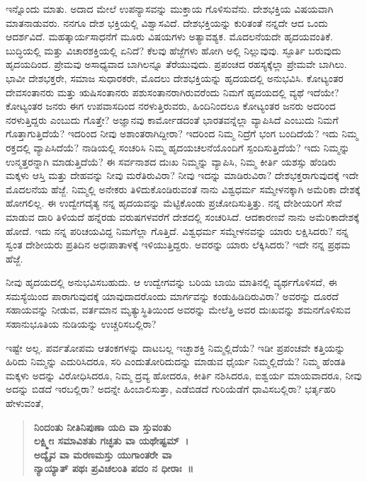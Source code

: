 \vskip   4pt

ಇನ್ನೊಂದು ಮಾತು. ಅದಾದ ಮೇಲೆ ಉಪನ್ಯಾಸವನ್ನು ಮುಕ್ತಾಯ ಗೊಳಿಸುವೆನು. ದೇಶಭಕ್ತಿಯ ವಿಷಯವಾಗಿ ಮಾತನಾಡುವರು. ನನಗೂ ದೇಶ ಭಕ್ತಿಯಲ್ಲಿ ವಿಶ್ವಾಸವಿದೆ. ದೇಶಭಕ್ತಿಯನ್ನು ಕುರಿತಂತೆ ನನ್ನದೇ ಆದ ಒಂದು ಆದರ್ಶವಿದೆ. ಮಹತ್ಕಾರ್ಯಸಾಧನೆಗೆ ಮೂರು ವಿಷಯಗಳು ಅತ್ಯಾವಶ್ಯಕ. ಮೊದಲನೆಯದೇ ಹೃದಯವಂತಿಕೆ. ಬುದ್ಧಿಯಲ್ಲಿ ಮತ್ತು ವಿಚಾರಶಕ್ತಿಯಲ್ಲಿ ಏನಿದೆ? ಕೆಲವು ಹೆಜ್ಜೆಗಳು ಹೋಗಿ ಅಲ್ಲಿ ನಿಲ್ಲುವುವು. ಸ್ಫೂರ್ತಿ ಬರುವುದು ಹೃದಯದಿಂದ. ಪ್ರೇಮವು ಅಸಾಧ್ಯವಾದ ಬಾಗಿಲನ್ನೂ ತೆರೆಯುವುದು. ಪ್ರಪಂಚದ ರಹಸ್ಯಕ್ಕೆಲ್ಲಾ ಪ್ರೇಮವೇ ಬಾಗಿಲು. ಭಾವೀ ದೇಶಭಕ್ತರೇ, ಸಮಾಜ ಸುಧಾರಕರೇ, ಮೊದಲು ದೇಶಭಕ್ತಿಯನ್ನು ಹೃದಯದಲ್ಲಿ ಅನುಭವಿಸಿ. ಕೋಟ್ಯಂತರ ದೇವಸಂತಾನರು ಮತ್ತು ಋಷಿಸಂತಾನರು ಪಶುಸಂತಾನರಾಗಿರುವರೆಂದು ನಿಮಗೆ ಹೃದಯದಲ್ಲಿ ವ್ಯಥೆ ಇದೆಯೇ? ಕೋಟ್ಯಂತರ ಜನರು ಈಗ ಉಪವಾಸದಿಂದ ನರಳುತ್ತಿರುವರು, ಹಿಂದಿನಿಂದಲೂ ಕೋಟ್ಯಂತರ ಜನರು ಅದರಿಂದ ನರಳುತ್ತಿದ್ದರು ಎಂಬುದು ಗೊತ್ತೇ? ಅಜ್ಞಾನವು ಕಾರ್ಮೋಡದಂತೆ ಭಾರತವನ್ನೆಲ್ಲಾ ವ್ಯಾಪಿಸಿದೆ ಎಂಬುದು ನಿಮಗೆ ಗೊತ್ತಾಗುತ್ತಿದೆಯೆ? ಇದರಿಂದ ನೀವು ಅಶಾಂತರಾಗಿದ್ದೀರಾ? ಇದರಿಂದ ನಿಮ್ಮ ನಿದ್ರೆಗೆ ಭಂಗ ಬಂದಿದೆಯೆ? ಇದು ನಿಮ್ಮ ರಕ್ತದಲ್ಲಿ ವ್ಯಾಪಿಸಿದೆಯೆ? ನಾಡಿಯಲ್ಲಿ ಸಂಚರಿಸಿ ನಿಮ್ಮ ಹೃದಯಚಲನೆಯೊಂದಿಗೆ ಸ್ಪಂದಿಸುತ್ತಿದೆಯೆ? ಇದು ನಿಮ್ಮನ್ನು ಉನ್ಮತ್ತರನ್ನಾಗಿ ಮಾಡುತ್ತಿದೆಯೆ? ಈ ಸರ್ವನಾಶದ ದುಃಖ ನಿಮ್ಮನ್ನು ವ್ಯಾಪಿಸಿ, ನಿಮ್ಮ ಕೀರ್ತಿ ಯಶಸ್ಸು ಹೆಂಡಿರು ಮಕ್ಕಳು ಆಸ್ತಿ ಮತ್ತು ದೇಹವನ್ನು ನೀವು ಮರೆತಿರುವಿರಾ? ನೀವು ಇದನ್ನು ಮಾಡಿರುವಿರಾ? ದೇಶಭಕ್ತರಾಗುವುದಕ್ಕೆ ಇದೇ ಮೊದಲನೆಯ ಹೆಜ್ಜೆ. ನಿಮ್ಮಲ್ಲಿ ಅನೇಕರು ತಿಳಿದುಕೊಂಡಿರುವಂತೆ ನಾನು ವಿಶ್ವಧರ್ಮ ಸಮ್ಮೇಳನಕ್ಕಾಗಿ ಅಮೆರಿಕಾ ದೇಶಕ್ಕೆ ಹೋಗಲಿಲ್ಲ. ಈ ಉದ್ವೇಗದೈತ್ಯ ನನ್ನ ಹೃದಯವನ್ನು ಮೆಟ್ಟಿಕೊಂಡು ಪ್ರಚೋದಿಸುತ್ತಿತ್ತು. ನನ್ನ ದೇಶೀಯರಿಗೆ ಸೇವೆ ಮಾಡುವ ದಾರಿ ತಿಳಿಯದೆ ಹನ್ನೆರಡು ವರುಷಗಳವರೆಗೆ ದೇಶದಲ್ಲಿ ಸಂಚರಿಸಿದೆ. ಆದಕಾರಣವೆ ನಾನು ಅಮೆರಿಕಾದೇಶಕ್ಕೆ ಹೋದೆ. ಇದು ನನ್ನ ಪರಿಚಯವಿದ್ದ ನಿಮಗೆಲ್ಲಾ ಗೊತ್ತಿದೆ. ವಿಶ್ವಧರ್ಮ ಸಮ್ಮೇಳನವನ್ನು ಯಾರು ಲಕ್ಷಿಸಿದರು? ನನ್ನ ಸ್ವಂತ ದೇಶೀಯರು ಪ್ರತಿದಿನ ಅಧಃಪಾತಾಳಕ್ಕೆ ಇಳಿಯುತ್ತಿದ್ದರು. ಅವರನ್ನು ಯಾರು ಲೆಕ್ಕಿಸಿದರು? ಇದೇ ನನ್ನ ಪ್ರಥಮ ಹೆಜ್ಜೆ.

\vskip   4pt

ನೀವು ಹೃದಯದಲ್ಲಿ ಅನುಭವಿಸಬಹುದು. ಆ ಉದ್ವೇಗವನ್ನು ಬರಿಯ ಬಾಯಿ ಮಾತಿನಲ್ಲಿ ವ್ಯರ್ಥಗೊಳಿಸದೆ, ಈ ಸಮಸ್ಯೆಯಿಂದ ಪಾರಾಗುವುದಕ್ಕೆ ಯಾವುದಾದರೊಂದು ಮಾರ್ಗವನ್ನು ಕಂಡುಹಿಡಿದಿರುವಿರಾ? ಅವರನ್ನು ದೂರದೆ ಸಹಾಯವನ್ನು ನೀಡುವ, ವರ್ತಮಾನ ಮೃತ್ಯುಸ್ಥಿತಿಯಿಂದ ಅವರನ್ನು ಮೇಲೆತ್ತಿ ಅವರ ದುಃಖವನ್ನು ಶಮನಗೊಳಿಸುವ ಸಹಾನುಭೂತಿಯ ನುಡಿಯನ್ನು ಉಚ್ಚರಿಸಬಲ್ಲಿರಾ?

\vskip   4pt

ಇಷ್ಟೇ ಅಲ್ಲ. ಪರ್ವತೋಪಮ ಆತಂಕಗಳನ್ನು ದಾಟಬಲ್ಲ ಇಚ್ಛಾಶಕ್ತಿ ನಿಮ್ಮಲ್ಲಿದೆಯೆ? ಇಡೀ ಪ್ರಪಂಚವೇ ಕತ್ತಿಯನ್ನು ಹಿರಿದು ನಿಮ್ಮನ್ನು ಎದುರಿಸಿದರೂ, ಸರಿ ಎಂದು\break ತೋರಿದುದನ್ನು ಮಾಡುವ ಧೈರ್ಯ ನಿಮ್ಮಲ್ಲಿದೆಯೆ? ನಿಮ್ಮ ಹೆಂಡತಿ ಮಕ್ಕಳು ಅದನ್ನು ವಿರೋಧಿಸಿದರೂ, ನಿಮ್ಮ ದ್ರವ್ಯ ಹೋದರೂ, ಕೀರ್ತಿ ನಶಿಸಿದರೂ, ಐಶ್ವರ್ಯ ಮಾಯವಾದರೂ, ನೀವು ಅದನ್ನು ಬಿಡದೆ ಇರಬಲ್ಲಿರಾ? ಅದನ್ನೇ ಹಿಂಬಾಲಿಸುತ್ತಾ, ಎಡೆಬಿಡದೆ ಗುರಿಯೆಡೆಗೆ ಧಾವಿಸಬಲ್ಲಿರಾ? ಭರ್ತೃಹರಿ ಹೇಳುವಂತೆ,

\begin{verse}
\textbf{ನಿಂದಂತು ನೀತಿನಿಪುಣಾ ಯದಿ ವಾ ಸ್ತುವಂತು}\\\textbf{ಲಕ್ಷ್ಮೀಃ ಸಮಾವಿಶತು ಗಚ್ಛತು ವಾ ಯಥೇಷ್ಟಮ್​~।}\\\textbf{ಅದ್ಯೈವ ವಾ ಮರಣಮಸ್ತು ಯುಗಾಂತರೇ ವಾ}\\\textbf{ನ್ಯಾಯ್ಯಾತ್​ ಪಥಃ ಪ್ರವಿಚಲಂತಿ ಪದಂ ನ ಧೀರಾಃ~॥}
\end{verse}

